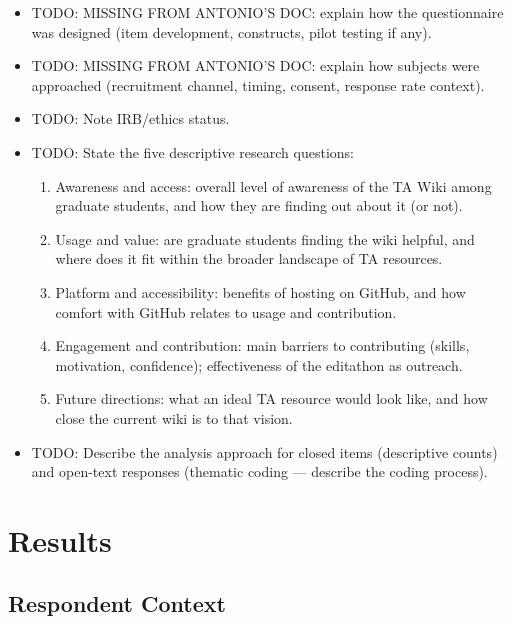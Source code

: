 \documentclass[11pt]{article}
\newcommand{\td}[1]{\item \textcolor{red!70!black}{TODO: #1}}
\begin{document}
\begin{itemize}
  \td{MISSING FROM ANTONIO'S DOC: explain how the questionnaire was designed (item development, constructs, pilot testing if any).}
  \td{MISSING FROM ANTONIO'S DOC: explain how subjects were approached (recruitment channel, timing, consent, response rate context).}
  \td{Note IRB/ethics status.}
  \td{State the five descriptive research questions:}
  \begin{enumerate}
    \item Awareness and access: overall level of awareness of the TA Wiki among graduate students, and how they are finding out about it (or not).
    \item Usage and value: are graduate students finding the wiki helpful, and where does it fit within the broader landscape of TA resources.
    \item Platform and accessibility: benefits of hosting on GitHub, and how comfort with GitHub relates to usage and contribution.
    \item Engagement and contribution: main barriers to contributing (skills, motivation, confidence); effectiveness of the editathon as outreach.
    \item Future directions: what an ideal TA resource would look like, and how close the current wiki is to that vision.
  \end{enumerate}
  \td{Describe the analysis approach for closed items (descriptive counts) and open-text responses (thematic coding --- describe the coding process).}
\end{itemize}

\section{Results}


\subsection{Respondent Context}
\end{document}

